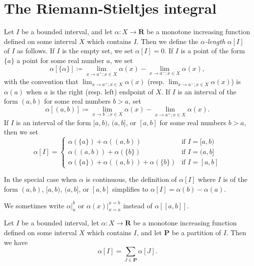 \section{The Riemann-Stieltjes integral}\label{sec 11.8}

\begin{definition}\label{11.8.1}
    Let \(I\) be a bounded interval, and let \(\alpha : X \to \mathbf{R}\) be a monotone increasing function defined on some interval \(X\) which contains \(I\).
    Then we define the \emph{\(\alpha\)-length} \(\alpha[I]\) of \(I\) as follows.
    If \(I\) is the empty set, we set \(\alpha[I] = 0\).
    If \(I\) is a point of the form \(\{a\}\) a point for some real number \(a\), we set
    \[
        \alpha[\{\alpha\}] \coloneqq \lim_{x \to a^+ ; x \in X} \alpha(x) - \lim_{x \to a^- ; x \in X} \alpha(x),
    \]
    with the convention that \(\lim_{x \to a^+ ; x \in X} \alpha(x)\) (resp. \(\lim_{x \to a^- ; x \in X} \alpha(x)\)) is \(\alpha(a)\) when \(a\) is the right (resp. left) endpoint of \(X\).
    If \(I\) is an interval of the form \((a, b)\) for some real numbers \(b > a\), set
    \[
        \alpha[(a, b)] \coloneqq \lim_{x \to b^- ; x \in X} \alpha(x) - \lim_{x \to a^+ ; x \in X} \alpha(x).
    \]
    If \(I\) is an interval of the form \([a, b)\), \((a, b]\), or \([a, b]\) for some real numbers \(b > a\), then we set
    \[
        \alpha[I] = \begin{cases}
            \alpha(\{a\}) + \alpha((a, b))                 & \text{if } I = [a, b) \\
            \alpha((a, b)) + \alpha(\{b\})                 & \text{if } I = (a, b] \\
            \alpha(\{a\}) + \alpha((a, b)) + \alpha(\{b\}) & \text{if } I = [a, b]
        \end{cases}
    \]
\end{definition}

\begin{note}
    In the special case when \(\alpha\) is continuous, the definition of \(\alpha[I]\) where \(I\) is of the form \((a, b)\), \([a, b)\), \((a, b]\), or \([a, b]\) simplifies to \(\alpha[I] = \alpha(b) - \alpha(a)\).
\end{note}

\begin{note}
    We sometimes write \(\alpha\big|_a^b\) or \(\alpha(x)\big|_{x = a}^{x = b}\) instead of \(\alpha[[a, b]]\).
\end{note}

\setcounter{theorem}{3}
\begin{lemma}\label{11.8.4}
    Let \(I\) be a bounded interval, let \(\alpha : X \to \mathbf{R}\) be a monotone increasing function defined on some interval \(X\) which contains \(I\), and let \(\mathbf{P}\) be a partition of \(I\).
    Then we have
    \[
        \alpha[I] = \sum_{J \in \mathbf{P}} \alpha[J].
    \]
\end{lemma}

